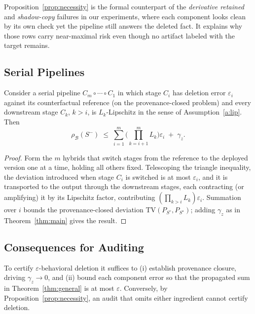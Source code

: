 Proposition~\ref{prop:necessity} is the formal counterpart of the
\emph{ derivative retained} and \emph{shadow-copy} failures in
our experiments, where each component looks clean by its own check yet
the pipeline still answers the deleted fact. It explains why those rows
carry near-maximal risk even though no artifact labeled with the target
remains.

\subsection{Serial Pipelines}

\begin{theorem}
\label{thm:general}
Consider a serial pipeline $C_{m}\circ\cdots\circ C_{1}$ in which stage
$C_{i}$ has deletion error $\varepsilon_{i}$ against its counterfactual
reference (on the provenance-closed problem) and every downstream stage
$C_{k}$, $k>i$, is $L_{k}$-Lipschitz in the sense of
Assumption~\ref{a:lip}. Then
\[
 \rho_{\mathcal{B}}(S^{-})
 \;\le\;
 \sum_{i=1}^{m}\Big(\textstyle\prod_{k=i+1}^{m}L_{k}\Big)\varepsilon_{i}
 \;+\;\gamma_{z}.
\]
\end{theorem}

\begin{proof}
Form the $m$ hybrids that switch stages from the reference to the
deployed version one at a time, holding all others fixed. Telescoping
the triangle inequality, the deviation introduced when stage $C_{i}$ is
switched is at most $\varepsilon_{i}$, and it is transported to the
output through the downstream stages, each contracting (or amplifying)
it by its Lipschitz factor, contributing
$(\prod_{k>i}L_{k})\varepsilon_{i}$. Summation over $i$ bounds the
provenance-closed deviation $\mathrm{TV}(P_{S^{\diamond}},P_{S^{\star}})$;
adding $\gamma_{z}$ as in Theorem~\ref{thm:main} gives the result.
\end{proof}

\subsection{Consequences for Auditing}

\begin{corollary}
\label{cor:audit}
To certify $\varepsilon$-behavioral deletion it suffices to (i) establish
provenance closure, driving $\gamma_{z}\to 0$, and (ii) bound each
component error so that the propagated sum in
Theorem~\ref{thm:general} is at most $\varepsilon$. Conversely, by
Proposition~\ref{prop:necessity}, an audit that omits either ingredient
cannot certify deletion.
\end{corollary}

